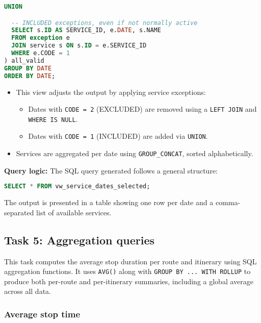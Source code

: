 \documentclass[a4paper, 12pt]{article}
\begin{document}
\begin{enumerate}
\begin{lstlisting}[language=SQL]
  UNION

  -- INCLUDED exceptions, even if not normally active
  SELECT s.ID AS SERVICE_ID, e.DATE, s.NAME
  FROM exception e
  JOIN service s ON s.ID = e.SERVICE_ID
  WHERE e.CODE = 1
) all_valid
GROUP BY DATE
ORDER BY DATE;
    \end{lstlisting}

    \begin{itemize}
        \item This view adjusts the output by applying service exceptions:
        \begin{itemize}
            \item Dates with \texttt{CODE = 2} (EXCLUDED) are removed using a \texttt{LEFT JOIN} and \texttt{WHERE IS NULL}.
            \item Dates with \texttt{CODE = 1} (INCLUDED) are added via \texttt{UNION}.
        \end{itemize}
        \item Services are aggregated per date using \texttt{GROUP\_CONCAT}, sorted alphabetically.
    \end{itemize}
\end{enumerate}


\textbf{Query logic:} The SQL query generated follows a general structure:
    \begin{lstlisting}[language=SQL]
SELECT * FROM vw_service_dates_selected;
    \end{lstlisting}
The output is presented in a table showing one row per date and a comma-separated list of available services.





% 
\newpage
\subsection{Task 5: Aggregation queries}
This task computes the average stop duration per route and itinerary using SQL aggregation functions. It uses \texttt{AVG()} along with \texttt{GROUP BY ... WITH ROLLUP} to produce both per-route and per-itinerary summaries, including a global average across all data.

\subsubsection{Average stop time}
\end{document}
